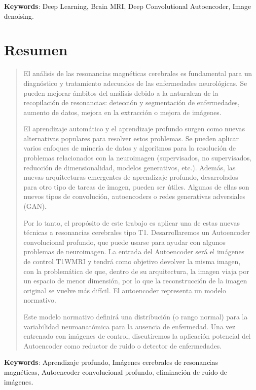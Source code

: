 
\textbf{Keywords}: Deep Learning, Brain MRI, Deep Convolutional Autoencoder, Image denoising.

\clearpage

\chapter*{\centering Resumen}


\begin{quote}
{El análisis de las resonancias magnéticas cerebrales es fundamental para un diagnóstico y tratamiento adecuados de las enfermedades neurológicas. Se pueden mejorar ámbitos del análisis debido a la naturaleza de la recopilación de resonancias: detección y segmentación de enfermedades, aumento de datos, mejora en la extracción o mejora de imágenes.

El aprendizaje automático y el aprendizaje profundo surgen como nuevas alternativas populares para resolver estos problemas. Se pueden aplicar varios enfoques de minería de datos y algoritmos para la resolución de problemas relacionados con la neuroimagen (supervisados, no supervisados, reducción de dimensionalidad, modelos generativos, etc.). Además, las nuevas arquitecturas emergentes de aprendizaje profundo, desarrolados para otro tipo de tareas de imagen, pueden ser útiles. Algunas de ellas son nuevos tipos de convolución, autoencoders o redes generativas adversiales (GAN).

Por lo tanto, el propósito de este trabajo es aplicar una de estas nuevas técnicas a resonancias cerebrales tipo T1. Desarrollaremos un Autoencoder convolucional profundo, que puede usarse para ayudar con algunos problemas de neuroimagen. La entrada del Autoencoder será el imágenes de control T1WMRI y tendrá como objetivo devolver la misma imagen, con la problemática de que, dentro de su arquitectura, la imagen viaja por un espacio de menor dimensión, por lo que la reconstrucción de la imagen original se vuelve más difícil. El autoencoder representa un modelo normativo.

Este modelo normativo definirá una distribución (o rango normal) para la variabilidad neuroanatómica para la ausencia de enfermedad. Una vez entrenado con imágenes de control, discutiremos la aplicación potencial del Autoencoder como reductor de ruido o detector de enfermedades.

}
\end{quote}
\textbf{Keywords}: Aprendizaje profundo, Imágenes cerebrales de resonancias magnéticas, Autoencoder convolucional profundo, eliminación de ruido de imágenes.



\clearpage
